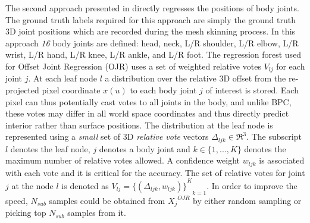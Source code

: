 The second approach presented in \cite{shotton2013efficient} directly regresses the positions of body joints. The ground truth labels required for this approach are simply the ground truth 3D joint positions which are recorded during the mesh skinning process. In this approach \emph{16} body joints are defined: head, neck, L/R shoulder, L/R elbow, L/R wrist, L/R hand, L/R knee, L/R ankle, and L/R foot. The regression forest used for Offset Joint Regression (OJR) uses a set of weighted relative votes $V_{lj}$ for each joint $j$. At each leaf node $l$ a distribution over the relative 3D offset from the re-projected pixel coordinate $x(u)$ to each body joint $j$ of interest is stored. Each pixel can thus potentially cast votes to all joints in the body, and unlike BPC, these votes may differ in all world space coordinates and thus directly predict interior rather than surface positions. The distribution at the leaf node is represented using a \emph{small} set of 3D \emph{relative vote} vectors $\Delta_{ljk} \in \Re^3$. The subscript $l$ denotes the leaf node, $j$ denotes a body joint and $k \in \lbrace 1,...,K \rbrace$ denotes the maximum number of relative votes allowed. A confidence weight $w_{ljk}$ is associated with each vote and it is critical for the accuracy. The set of relative votes for joint $j$ at the node $l$ is denoted as $V_{lj}={{\lbrace (\Delta_{ljk},w_{ljk}) \rbrace}^K}_{k=1}$. In order to improve the speed, $N_{sub}$ samples could be obtained from ${X_j}^{OJR}$ by either random sampling or picking top $N_{sub}$ samples from it. 
